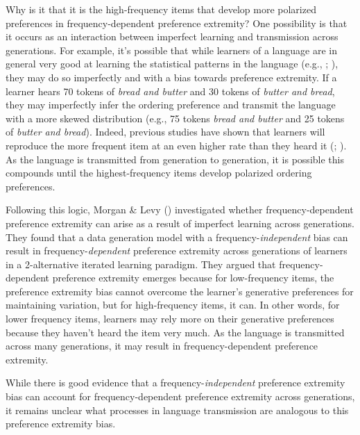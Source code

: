 \documentclass[
  12pt,
  letterpaper,
]{scrreport}
\begin{document}
Why is it that it is the high-frequency items that develop more
polarized preferences in frequency-dependent preference extremity? One
possibility is that it occurs as an interaction between imperfect
learning and transmission across generations. For example, it's possible
that while learners of a language are in general very good at learning
the statistical patterns in the language (e.g.,
; ), they
may do so imperfectly and with a bias towards preference extremity. If a
learner hears 70 tokens of \emph{bread and butter} and 30 tokens of
\emph{butter and bread}, they may imperfectly infer the ordering
preference and transmit the language with a more skewed distribution
(e.g., 75 tokens \emph{bread and butter} and 25 tokens of
\emph{butter and bread}). Indeed, previous studies have shown that
learners will reproduce the more frequent item at an even higher rate
than they heard it (; ). As the language is transmitted from generation
to generation, it is possible this compounds until the highest-frequency
items develop polarized ordering preferences.

Following this logic, Morgan \& Levy
()
investigated whether frequency-dependent preference extremity can arise
as a result of imperfect learning across generations. They found that a
data generation model with a frequency-\emph{independent} bias can
result in frequency-\emph{dependent} preference extremity across
generations of learners in a 2-alternative iterated learning paradigm.
They argued that frequency-dependent preference extremity emerges
because for low-frequency items, the preference extremity bias cannot
overcome the learner's generative preferences for maintaining variation,
but for high-frequency items, it can. In other words, for lower
frequency items, learners may rely more on their generative preferences
because they haven't heard the item very much. As the language is
transmitted across many generations, it may result in
frequency-dependent preference extremity.

While there is good evidence that a frequency-\emph{independent}
preference extremity bias can account for frequency-dependent preference
extremity across generations, it remains unclear what processes in
language transmission are analogous to this preference extremity bias.
\end{document}
